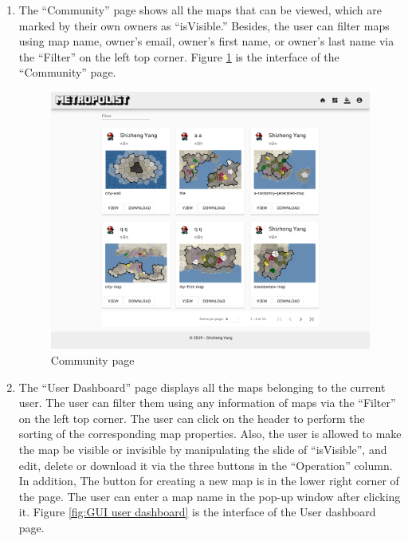 \begin{enumerate}
  \item The ``Community'' page shows all the maps that can be viewed, which are marked by their own owners as ``isVisible.'' Besides, the user can filter maps using map name, owner's email, owner's first name, or owner's last name via the ``Filter'' on the left top corner. Figure \ref{fig:GUI community} is the interface of the ``Community'' page.

  \begin{figure}[htbp]
    \includegraphics[width=\textwidth]{section04/assets/GUI-community.png}
    \caption{Community page}
    \label{fig:GUI community}
  \end{figure}

  \item The ``User Dashboard'' page displays all the maps belonging to the current user. The user can filter them using any information of maps via the ``Filter'' on the left top corner. The user can click on the header to perform the sorting of the corresponding map properties. Also, the user is allowed to make the map be visible or invisible by manipulating the slide of ``isVisible'', and edit, delete or download it via the three buttons in the ``Operation'' column. In addition, The button for creating a new map is in the lower right corner of the page. The user can enter a map name in the pop-up window after clicking it. Figure \ref{fig:GUI user dashboard} is the interface of the User dashboard page.


\end{enumerate}
